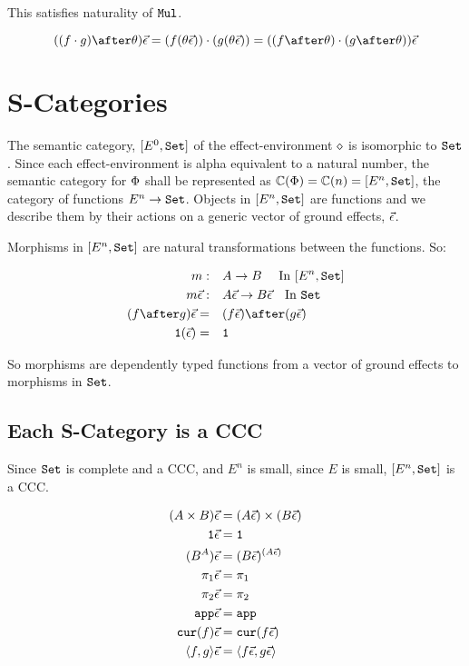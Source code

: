 \documentclass{report}
\begin{document}
This satisfies naturality of $\Mul$.

\begin{equation}
    ((f\dot g)\after \theta)\ev = (f(\theta\ev))\dot(g(\theta\ev)) = ((f\after\theta)\dot(g\after\theta))\ev
\end{equation}

\section{S-Categories}
The semantic category, $[E^0, \set]$ of the effect-environment $\nil$ is isomorphic to $\set$. Since each effect-environment is alpha equivalent to a natural number, the semantic category for $\P$ shall be represented as $\C(\P) = \C(n) = [E^n, \set]$, the category of functions $E^n\rightarrow \set$. Objects in $[E^n, \set]$ are functions and we describe them by their actions on a generic vector of ground effects, $\ev$.

Morphisms in $[E^n, \set]$ are natural transformations between the functions. So:

\begin{align}
    m:\quad&A \rightarrow B \qt{ In $[E^n, \set]$}\\
    m\ev:\quad& A\ev \rightarrow B\ev \qt{In $\set$}\\
    (f\after g)\ev =\quad& (f\ev)\after(g\ev)\\
    \1(\ev) =\quad& \1
\end{align}

So morphisms are dependently typed functions from a vector of ground effects to morphisms in $\set$.
\subsection{Each S-Category is a CCC}
Since $\set$ is complete and a CCC, and $E^n$ is small, since $E$ is small, $[E^n, \set]$ is a CCC.

\begin{align}
    (A\times B)\ev & = (A\ev)\times(B\ev)\\
    \1\ev & = \1\\
    (B^A)\ev &= (B\ev)^{(A\ev)}\\
    \p\ev & = \p\\
    \pp\ev & = \pp\\
    \app\ev & = \app\\
    \cur{f}\ev & = \cur{f\ev}\\
    \pr{f}{g}\ev & = \pr{f\ev}{g\ev}\\
\end{align}
\end{document}
